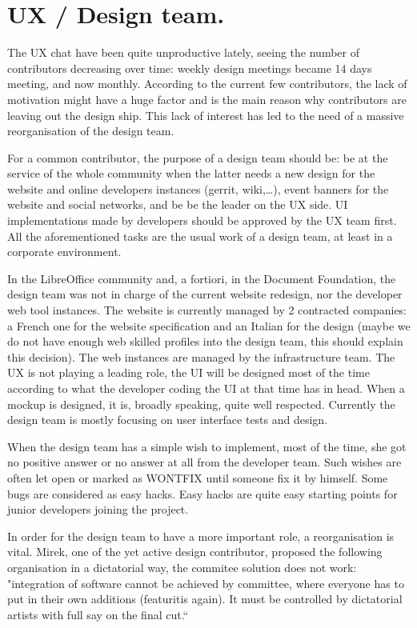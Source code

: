 \documentclass{article}
\begin{document}
\section{UX / Design team.}

The UX chat have been quite unproductive lately, seeing the number of contributors decreasing over time: weekly design meetings became 14 days meeting, and now monthly.
According to the current few contributors, the lack of motivation might have a huge factor and is the main reason why contributors are leaving out the design ship. This lack of interest has led to the need of a massive reorganisation of the design team.

For a common contributor, the purpose of a design team should be: be at the service of the whole community when the latter needs a new design for the website and online developers instances (gerrit, wiki,\ldots), event banners for the website and social networks, and be be the leader on the UX side. UI implementations made by developers should be approved by the UX team first. All the aforementioned tasks are the usual work of a design team, at least in a corporate environment.

In the LibreOffice community and, a fortiori, in the Document Foundation, the design team was not in charge of the current website redesign, nor the developer web tool instances. The website is currently managed by 2 contracted companies: a French one for the website specification and an Italian for the design (maybe we do not have enough web skilled profiles into the design team, this should explain this decision). The web instances are managed by the infrastructure team. The UX is not playing a leading role\cite{uxFiasco}, the UI will be designed most of the time according to what the developer coding the UI at that time has in head. When a mockup is designed, it is, broadly speaking, quite well respected\cite{startCenter}. Currently the design team is mostly focusing on user interface tests and design.

When the design team has a simple wish to implement, most of the time, she got no positive answer\cite{noPositiveAnswer} or no answer at all from the developer team. Such wishes are often let open or marked as WONTFIX until someone fix it by himself. Some bugs are considered as easy hacks\cite{easyHacks}. Easy hacks are quite easy starting points for junior developers joining the project. 

In order for the design team to have a more important role, a reorganisation is vital. Mirek, one of the yet active design contributor, proposed the following organisation in a dictatorial way, the commitee solution does not work: "integration of software cannot be achieved by committee, where everyone has to put in
their own additions (featuritis again). It must be controlled by dictatorial artists with full say on the final cut.``
\end{document}
